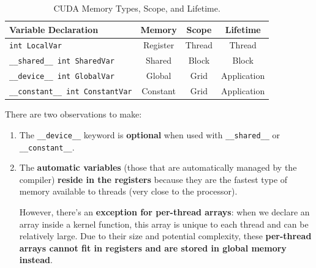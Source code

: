 \begin{table}[!htp]
    \centering
    \begin{tabular}{@{} l c c c @{}}
        \toprule
        \textbf{Variable Declaration} & \textbf{Memory} & \textbf{Scope} & \textbf{Lifetime} \\
        \midrule
        \texttt{int LocalVar} & Register & Thread & Thread \\
        \texttt{\_\_shared\_\_ int SharedVar} & Shared & Block & Block \\
        \texttt{\_\_device\_\_ int GlobalVar} & Global & Grid & Application \\
        \texttt{\_\_constant\_\_ int ConstantVar} & Constant & Grid & Application \\
        \bottomrule
    \end{tabular}
    \caption{CUDA Memory Types, Scope, and Lifetime.}
    \label{table: CUDA Memory Types, Scope, and Lifetime}
\end{table}

\noindent
There are two observations to make:
\begin{enumerate}
    \item The \texttt{\_\_device\_\_} keyword is \textbf{optional} when used with \texttt{\_\_shared\_\_} or \texttt{\_\_constant\_\_}.


    \item The \textbf{automatic variables} (those that are automatically managed by the compiler) \textbf{reside in the registers} because they are the fastest type of memory available to threads (very close to the processor).
    
    However, there's an \textbf{exception for per-thread arrays}: when we declare an array inside a kernel function, this array is unique to each thread and can be relatively large. Due to their size and potential complexity, these \textbf{per-thread arrays cannot fit in registers and are stored in global memory instead}.
\end{enumerate}

